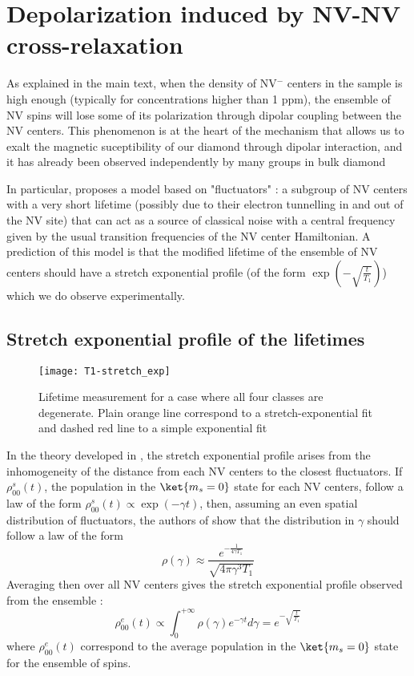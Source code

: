 \documentclass[preprintnumbers,amsmath,amssymb,onecolumn,12pt]{revtex4}
\begin{document}
\section{Depolarization induced by NV-NV cross-relaxation}
As explained in the main text, when the density of NV$^-$ centers in the sample is high enough (typically for concentrations higher than 1 ppm), the ensemble of NV spins will lose some of its polarization through dipolar coupling between the NV centers. This phenomenon is at the heart of the mechanism that allows us to exalt the magnetic suceptibility of our diamond through dipolar interaction, and it has already been observed independently by many groups in bulk diamond %

In particular, \cite{choi_depolarization_2017} proposes a model based on "fluctuators" : a subgroup of NV centers with a very short lifetime (possibly due to their electron tunnelling in and out of the NV site) that can act as a source of classical noise with a central frequency given by the usual transition frequencies of the NV center Hamiltonian. A prediction of this model is that the modified lifetime of the ensemble of NV centers should have a stretch exponential profile (of the form $\exp(-\sqrt{\frac{t}{T_1}})$) which we do observe experimentally.

\subsection{Stretch exponential profile of the lifetimes}
\begin{figure}
\label{stretch}
\texttt{[image: T1-stretch\_exp]}
\caption{Lifetime measurement for a case where all four classes are degenerate. Plain orange line correspond to a stretch-exponential fit and dashed red line to a simple exponential fit}
\end{figure}
In the theory developed in \cite{choi_depolarization_2017}, the stretch exponential profile arises from the inhomogeneity of the distance from each NV centers to the closest fluctuators. If $\rho_{00}^s(t)$, the population in the $\ket{m_s=0}$ state for each NV centers, follow a law of the form $\rho_{00}^s(t) \propto \exp(-\gamma t)$, then, assuming an even spatial distribution of fluctuators, the authors of \cite{choi_depolarization_2017} show that the distribution in $\gamma$ should follow a law of the form $$\rho(\gamma) \approx \frac{e^{-\frac{1}{4 \gamma T_1}}}{\sqrt{4 \pi \gamma^3 T_1}} $$
Averaging then over all NV centers gives the stretch exponential profile observed from the ensemble :
$$ \rho_{00}^e(t) \propto \int_0^{+\infty} \rho(\gamma) e^{-\gamma t} d\gamma = e^{-\sqrt{\frac{t}{T_1}}} $$
where $ \rho_{00}^e(t)$ correspond to the average population in the $\ket{m_s=0}$ state for the ensemble of spins.
\end{document}
